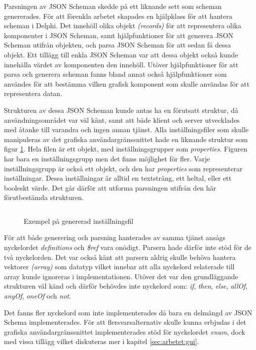 Parsningen av JSON Scheman skedde på ett liknande sett som scheman genererades. För att förenkla arbetet skapades en hjälpklass för att hantera scheman i Delphi. Det innehöll olika objekt \textit{(records)} för att representera olika komponenter i JSON Scheman, samt hjälpfunktioner för att generera JSON Scheman utifrån objekten, och parsa JSON Scheman för att sedan få dessa objekt. Ett tillägg till enkla JSON Scheman var att dessa objekt också kunde innehålla värdet av komponenten den innehöll. Utöver hjälpfunktioner för att parsa och generera scheman fanns bland annat också hjälpfunktioner som användes för att bestämma vilken grafisk komponent som skulle användas för att representera datan.

Strukturen av dessa JSON Scheman kunde antas ha en förutsatt struktur, då användningsområdet var väl känt, samt att både klient och server utvecklades med åtanke till varandra och ingen annan tjänst. Alla inställningsfiler som skulle manipuleras av det grafiska användargränssnittet hade en liknande struktur som figur \ref{fig:profile-file}. Hela filen är ett objekt, med inställningsgrupper som \textit{properties}. Figuren har bara en inställningsgrupp men det finns möjlighet för fler. Varje inställningsgrupp är också ett objekt, och den har \textit{properties} som representerar inställningar. Dessa inställningar är alltid en textsträng, ett heltal, eller ett booleskt värde. Det går därför att utforma parsningen utifrån den här förutbestämda strukturen.

\begin{figure}
	\inputminted[tabsize=2, frame=single, fontsize=\small, framesep=2mm, breaklines]{json}{code/0.json}
	\vspace{-1.7em}
	\caption{Exempel på genererad inställningsfil}
	\label{fig:profile-file}
\end{figure}

\noindent
För att både generering och parsning hanterades av samma tjänst ansågs nyckelordet \textit{definitions} och \textit{\$ref} vara onödigt. Parsern hade därför inte stöd för de två nyckelorden. Det var också känt att parsern aldrig skulle behöva hantera vektorer \textit{(array)} som datatyp vilket innebar att alla nyckelord relaterade till array kunde ignoreras i implementationen. Utöver det var den grundläggande strukturen väl känd och därför behövdes inte nyckelord som: \textit{if}, \textit{then}, \textit{else}, \textit{allOf}, \textit{anyOf}, \textit{oneOf} och \textit{not}.

Det fanns fler nyckelord som inte implementerades då bara en delmängd av JSON Schema implementerades. För att flersvarsalternativ skulle kunna erbjudas i det grafiska användargränssnittet implementerades stöd för nyckelordet \textit{enum}, dock med vissa tillägg vilket diskuteras mer i kapitel \ref{sec:arbetet:gui}.

